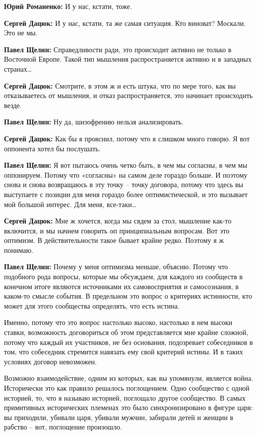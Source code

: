 \textbf{Юрий Романенко:} И у нас, кстати, тоже.

\textbf{Сергей Дацюк:} И у нас, кстати, та же самая ситуация. Кто виноват? Москали. Это
не мы.

\textbf{Павел Щелин:} Справедливости ради, это происходит активно не только в Восточной
Европе. Такой тип мышления распространяется активно и в западных странах…

\textbf{Сергей Дацюк:} Смотрите, в этом ж и есть штука, что по мере того, как вы
отказываетесь от мышления, и отказ распространяется, это начинает происходить
везде.

\textbf{Павел Щелин:} Ну да, шизофрению нельзя анализировать.

\textbf{Сергей Дацюк:} Как бы я прояснил, потому что я слишком много говорю. Я вот
оппонента хотел бы послушать.

\textbf{Павел Щелин:} Я вот пытаюсь очень четко быть, в чем мы согласны, в чем мы
оппонируем. Потому что «согласны» на самом деле гораздо больше. И поэтому снова
и снова возвращаюсь в эту точку – точку договора, потому что здесь вы
выступаете с позиции для меня гораздо более оптимистической, и это вызывает мой
большой интерес. Для меня, все-таки…

\textbf{Сергей Дацюк:} Мне ж хочется, когда мы сядем за стол, мышление как-то включится,
и мы начнем говорить оп принципиальным вопросам. Вот это оптимизм. В
действительности такое бывает крайне редко. Поэтому я ж понимаю.

\textbf{Павел Щелин:} Почему у меня оптимизма меньше, объясню. Потому что подобного рода
вопросы, которые мы обсуждаем, для каждого из сообществ в конечном итоге
являются источниками их самовосприятия и самосознания, в каком-то смысле
события. В предельном это вопрос о критериях истинности, кто может для этого
сообщества определять, что есть истина.

Именно, потому что это вопрос настолько высоко, настолько в нем высоки ставки,
возможность договориться об этом представляется мне крайне сложной, потому что
каждый их участников, не без основания, подозревает собеседников в том, что
собеседник стремится навязать ему свой критерий истины. И в таких условиях
договор невозможен.

Возможно взаимодействие, одним из которых, как вы упомянули, является война.
Исторически это как правило решалось поглощением. Одно сообщество с одной
историей, то, что я называю историей, поглощало другое сообщество. В самых
примитивных исторических племенах это было синхронизировано в фигуре царя: вы
приходили, убивали царя, убивали мужчин, забирали детей и женщин в рабство –
вот, поглощение произошло.

